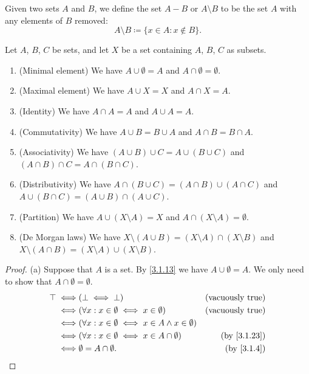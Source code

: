 \setcounter{thm}{26}
\begin{defn}\label{3.1.27}
  Given two sets \(A\) and \(B\), we define the set \(A - B\) or \(A \setminus B\) to be the set \(A\) with any elements of \(B\) removed:
  \[
    A \setminus B \coloneqq \{x \in A : x \notin B\}.
  \]
\end{defn}

\begin{prop}\label{3.1.28}
  Let \(A\), \(B\), \(C\) be sets, and let \(X\) be a set containing \(A\), \(B\), \(C\) as subsets.
  \begin{enumerate}
    \item (Minimal element) We have \(A \cup \emptyset = A\) and \(A \cap \emptyset = \emptyset\).
    \item (Maximal element) We have \(A \cup X = X\) and \(A \cap X = A\).
    \item (Identity) We have \(A \cap A = A\) and \(A \cup A = A\).
    \item (Commutativity) We have \(A \cup B = B \cup A\) and \(A \cap B = B \cap A\).
    \item (Associativity) We have \((A \cup B) \cup C = A \cup (B \cup C)\) and \((A \cap B) \cap C = A \cap (B \cap C)\).
    \item (Distributivity) We have \(A \cap (B \cup C) = (A \cap B) \cup (A \cap C)\) and \(A \cup (B \cap C) = (A \cup B) \cap (A \cup C)\).
    \item (Partition) We have \(A \cup (X \setminus A) = X\) and \(A \cap (X \setminus A) = \emptyset\).
    \item (De Morgan laws) We have \(X \setminus (A \cup B) = (X \setminus A) \cap (X \setminus B)\) and \(X \setminus (A \cap B) = (X \setminus A) \cup (X \setminus B)\).
  \end{enumerate}
\end{prop}

\begin{proof}{(a)}
  Suppose that \(A\) is a set.
  By \cref{3.1.13} we have \(A \cup \emptyset = A\).
  We only need to show that \(A \cap \emptyset = \emptyset\).
  \begin{align*}
    \top \iff & (\bot \iff \bot)                                                 & \text{(vacuously true)}   \\
    \iff      & (\forall x : x \in \emptyset \iff x \in \emptyset)               & \text{(vacuously true)}   \\
    \iff      & (\forall x : x \in \emptyset \iff x \in A \land x \in \emptyset)                             \\
    \iff      & (\forall x : x \in \emptyset \iff x \in A \cap \emptyset)        & \text{(by \cref{3.1.23})} \\
    \iff      & \emptyset = A \cap \emptyset.                                    & \text{(by \cref{3.1.4})}
  \end{align*}
\end{proof}

